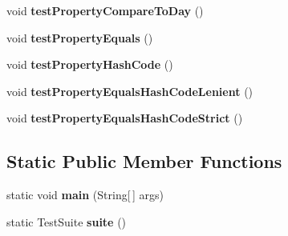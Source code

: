 \begin{DoxyCompactItemize}
\item 
\hypertarget{classorg_1_1joda_1_1time_1_1_test_local_date___properties_a1a7f20e9542e99b445a3fc8e9d239018}{void {\bfseries test\-Property\-Compare\-To\-Day} ()}\label{classorg_1_1joda_1_1time_1_1_test_local_date___properties_a1a7f20e9542e99b445a3fc8e9d239018}

\item 
\hypertarget{classorg_1_1joda_1_1time_1_1_test_local_date___properties_a5b9723d80f1f87e20471bb274fd5d55a}{void {\bfseries test\-Property\-Equals} ()}\label{classorg_1_1joda_1_1time_1_1_test_local_date___properties_a5b9723d80f1f87e20471bb274fd5d55a}

\item 
\hypertarget{classorg_1_1joda_1_1time_1_1_test_local_date___properties_a398c64644b67c0e0bbe5de6234f8a0f8}{void {\bfseries test\-Property\-Hash\-Code} ()}\label{classorg_1_1joda_1_1time_1_1_test_local_date___properties_a398c64644b67c0e0bbe5de6234f8a0f8}

\item 
\hypertarget{classorg_1_1joda_1_1time_1_1_test_local_date___properties_ab599375da901a8b7517923488012d94e}{void {\bfseries test\-Property\-Equals\-Hash\-Code\-Lenient} ()}\label{classorg_1_1joda_1_1time_1_1_test_local_date___properties_ab599375da901a8b7517923488012d94e}

\item 
\hypertarget{classorg_1_1joda_1_1time_1_1_test_local_date___properties_acd8d83b4936f513837421b627f66fa17}{void {\bfseries test\-Property\-Equals\-Hash\-Code\-Strict} ()}\label{classorg_1_1joda_1_1time_1_1_test_local_date___properties_acd8d83b4936f513837421b627f66fa17}

\end{DoxyCompactItemize}
\subsection*{Static Public Member Functions}
\begin{DoxyCompactItemize}
\item 
\hypertarget{classorg_1_1joda_1_1time_1_1_test_local_date___properties_ae81d60bfe023aa00d09b78755a93e650}{static void {\bfseries main} (String\mbox{[}$\,$\mbox{]} args)}\label{classorg_1_1joda_1_1time_1_1_test_local_date___properties_ae81d60bfe023aa00d09b78755a93e650}

\item 
\hypertarget{classorg_1_1joda_1_1time_1_1_test_local_date___properties_a7599dcb7fcb927adb791535a0a96560a}{static Test\-Suite {\bfseries suite} ()}\label{classorg_1_1joda_1_1time_1_1_test_local_date___properties_a7599dcb7fcb927adb791535a0a96560a}

\end{DoxyCompactItemize}

